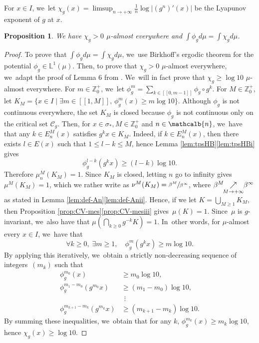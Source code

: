 \documentclass[10pt]{amsart}
\newcommand{\mcbn}{{\mathcalb{n}}}
\newtheorem{prop}[thm]{Proposition}
\theoremstyle{definition}
\newcommand{\bbZ}{{\mathbb{Z}}}
\begin{document}
For $x \in I$, we~let $\chi_g(x) = \limsup_{n \to +\infty} \frac{1}{n} \log |(g^n)'(x)|$ be the Lyapunov exponent of $g$ at $x$.

\begin{prop}
\label{prop:expo-pos}
We have $\chi_g > 0$ $\mu$-almost everywhere and $\int \phi_g d \mu = \int \chi_g d \mu$.
\end{prop}

\begin{proof}
To prove that $\int \phi_g d \mu = \int \chi_g d \mu$, we~use Birkhoff's ergodic theorem for the potential $\phi_g \in \mathbb{L}^1(\mu)$.
Then, to prove that $\chi_g > 0$ $\mu$-almost everywhere, we~adapt the proof of Lemma 6 from \cite{MR4703423}. We~will in fact prove that $\chi_g \geq \log 10$ $\mu$-almost everywhere.
For $m \in \bbZ_0^+$, we~let $\phi_g^m = \sum_{k \in [\![ 0, m-1 ]\!]} \phi_g \circ g^k$.
For $M \in \bbZ_0^+$, let $K_M = \{ x \in I \mid \exists m \in [\![ 1, M ]\!],\, \phi_g^m(x) \geq m \log 10 \}$.
Although $\phi_g$ is not continuous everywhere, the set $K_M$ is closed because $\phi_g$ is not continuous only on the critical set $\mathcal{C}_g$.
Then, for $x \in \sigma_*, M \in \bbZ_0^+$ and $n \in \mcbn$, we~have that any $k \in E_n^M(x)$ satisfies $g^k x \in K_M$.
Indeed, if $k \in E_n^M(x)$, then there exists $l \in E(x)$ such that $1 \leq l-k \leq M$, hence Lemma \ref{lem:tpsHB}\eqref{lem:tpsHBi} gives
\[
\phi_g^{l-k}(g^k x) \geq (l-k) \log 10.
\]
Therefore $\mu_n^M(K_M) \!=\! 1$. Since $K_M$ is closed, letting $n$ go to infinity gives \hbox{$\mu^M(K_M) \!=\! 1$}, which we rather write as $\nu^M(K_M) = \sfrac{\beta^M}{\beta^{\infty}}$, where $\beta^M \mkern-8mu\underset{M \to +\infty}{\nearrow}\mkern-6mu\beta^{\infty}$ as stated in Lemma \ref{lem:def-An}\eqref{lem:def-Anii}.
Hence, if we let $K \!=\! \bigcup_{M \geq 1} K_M$, then Proposition \ref{prop:CV-mes}\eqref{prop:CV-mesiii} gives~\hbox{$\mu(K) \!=\! 1$}.
Since~$\mu$ is $g$-invariant, we~also have that $\mu (\bigcap_{k \geq 0} g^{-k} K) = 1$. In~other words, for $\mu$-almost every $x \in I$, we~have that
\[
\forall k \geq 0,\; \exists m \geq 1,\quad \phi_g^m(g^k x) \geq m \log 10.
\]
By applying this iteratively, we~obtain a strictly non-decreasing sequence of integers~$(m_k)$ such that
\begin{align*}
\phi_g^{m_0}(x) &\geq m_0 \log 10,\\
\phi_g^{m_1 - m_0}(g^{m_0} x) &\geq (m_1 - m_0) \log 10,\\[-5pt]
&\;\,\vdots\\[-5pt]
\phi_g^{m_{k+1} - m_k}(g^{m_k} x) &\geq (m_{k+1} - m_k) \log 10.
\end{align*}
By summing these inequalities, we~obtain that for any $k$, $\phi_g^{m_k}(x) \geq m_k \log 10$, hence $\chi_g(x) \geq \log 10$.
\end{proof}
\end{document}
